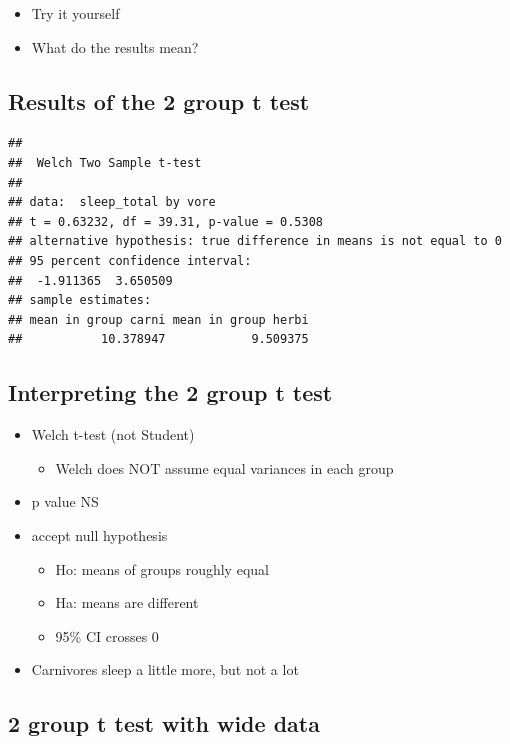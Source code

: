 \documentclass[
]{book}
\providecommand{\tightlist}{%
  \setlength{\itemsep}{0pt}\setlength{\parskip}{0pt}}
\begin{document}
\begin{itemize}
\tightlist
\item
  Try it yourself
\item
  What do the results mean?
\end{itemize}

\hypertarget{results-of-the-2-group-t-test}{%
\subsection{Results of the 2 group t test}\label{results-of-the-2-group-t-test}}

\begin{verbatim}
## 
##  Welch Two Sample t-test
## 
## data:  sleep_total by vore
## t = 0.63232, df = 39.31, p-value = 0.5308
## alternative hypothesis: true difference in means is not equal to 0
## 95 percent confidence interval:
##  -1.911365  3.650509
## sample estimates:
## mean in group carni mean in group herbi 
##           10.378947            9.509375
\end{verbatim}

\hypertarget{interpreting-the-2-group-t-test}{%
\subsection{Interpreting the 2 group t test}\label{interpreting-the-2-group-t-test}}

\begin{itemize}
\tightlist
\item
  Welch t-test (not Student)

  \begin{itemize}
  \tightlist
  \item
    Welch does NOT assume equal variances in each group
  \end{itemize}
\item
  p value NS
\item
  accept null hypothesis

  \begin{itemize}
  \tightlist
  \item
    Ho: means of groups roughly equal
  \item
    Ha: means are different
  \item
    95\% CI crosses 0
  \end{itemize}
\item
  Carnivores sleep a little more, but not a lot
\end{itemize}

\hypertarget{group-t-test-with-wide-data}{%
\subsection{2 group t test with wide data}\label{group-t-test-with-wide-data}}
\end{document}
